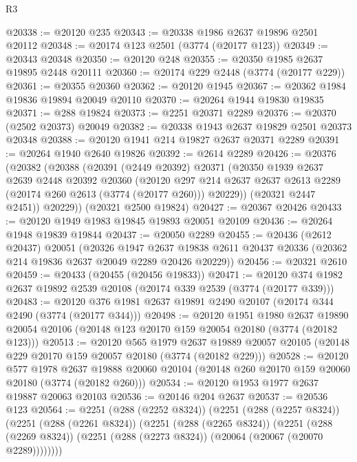 \begin{lexlean}{R3}
\begin{coremodule}
@20338 := @20120 @235
@20343 := @20338 @1986 @2637 @19896 @2501 @20112
@20348 := @20174 @123 @2501 (@3774 (@20177 @123))
@20349 := @20343 @20348
@20350 := @20120 @248
@20355 := @20350 @1985 @2637 @19895 @2448 @20111
@20360 := @20174 @229 @2448 (@3774 (@20177 @229))
@20361 := @20355 @20360
@20362 := @20120 @1945
@20367 := @20362 @1984 @19836 @19894 @20049 @20110
@20370 := @20264 @1944 @19830 @19835
@20371 := @288 @19824
@20373 := @2251 @20371 @2289
@20376 := @20370 (@2502 @20373) @20049
@20382 := @20338 @1943 @2637 @19829 @2501 @20373 @20348
@20388 := @20120 @1941 @214 @19827 @2637 @20371 @2289
@20391 := @20264 @1940 @2640 @19826
@20392 := @2614 @2289
@20426 := @20376
    (@20382
      (@20388
        (@20391
          (@2449 @20392)
          @20371
          (@20350
            @1939
            @2637
            @2639
            @2448
            @20392
            @20360
            (@20120
              @297
              @214
              @2637
              @2637
              @2613
              @2289
              (@20174 @260 @2613 (@3774 (@20177 @260)))
              @20229))
          (@20321 @2447 @2451))
        @20229))
    (@20321 @2500 @19824)
@20427 := @20367 @20426
@20433 := @20120 @1949 @1983 @19845 @19893 @20051 @20109
@20436 := @20264 @1948 @19839 @19844
@20437 := @20050 @2289
@20455 := @20436
    (@2612 @20437)
    @20051
    (@20326
      @1947
      @2637
      @19838
      @2611
      @20437
      @20336
      (@20362 @214 @19836 @2637 @20049 @2289 @20426 @20229))
@20456 := @20321 @2610
@20459 := @20433 (@20455 (@20456 @19833))
@20471 := @20120 @374 @1982 @2637 @19892 @2539 @20108 (@20174 @339 @2539 (@3774 (@20177 @339)))
@20483 := @20120 @376 @1981 @2637 @19891 @2490 @20107 (@20174 @344 @2490 (@3774 (@20177 @344)))
@20498 := @20120
    @1951
    @1980
    @2637
    @19890
    @20054
    @20106
    (@20148 @123 @20170 @159 @20054 @20180 (@3774 (@20182 @123)))
@20513 := @20120
    @565
    @1979
    @2637
    @19889
    @20057
    @20105
    (@20148 @229 @20170 @159 @20057 @20180 (@3774 (@20182 @229)))
@20528 := @20120
    @577
    @1978
    @2637
    @19888
    @20060
    @20104
    (@20148 @260 @20170 @159 @20060 @20180 (@3774 (@20182 @260)))
@20534 := @20120 @1953 @1977 @2637 @19887 @20063 @20103
@20536 := @20146 @204 @2637
@20537 := @20536 @123
@20564 := @2251
    (@288 (@2252 @8324))
    (@2251
      (@288 (@2257 @8324))
      (@2251
        (@288 (@2261 @8324))
        (@2251
          (@288 (@2265 @8324))
          (@2251
            (@288 (@2269 @8324))
            (@2251 (@288 (@2273 @8324)) (@20064 (@20067 (@20070 @2289))))))))

\end{coremodule}
\end{lexlean}
